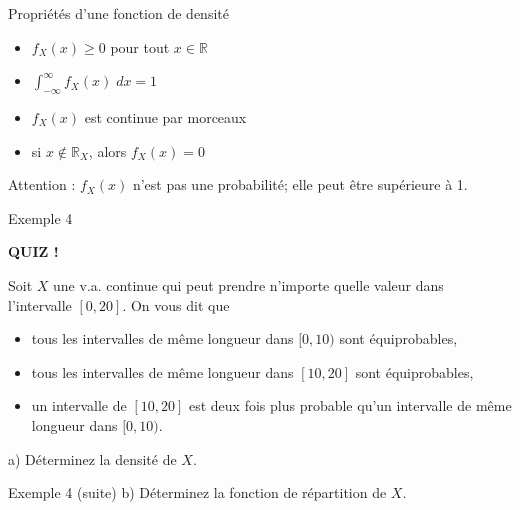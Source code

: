 \documentclass{BeamerTemplate}
\newcommand{\cibleReponse}{}
\newcommand{\lienreponse}[1]{\gdef\cibleReponse{#1}}
\begin{document}
\begin{frame}[t]{Propriétés d'une fonction de densité}

\begin{itemize}
 \item[1.] $f_X(x)\ge0$ pour tout $x\in\mathbb{R}$
 \item[2.] $\displaystyle\int_{-\infty}^\infty f_X(x)\;dx=1$
 \item[3.] $f_X(x)$ est continue par morceaux
 \item[4.] si $x\notin \mathbb{R}_X$, alors $f_X(x)=0$
\end{itemize}

{\color{gray}\small Attention : $f_X(x)$ n'est pas une probabilité; elle peut être supérieure à 1.}


\end{frame}

\begin{frame}[t,label=ex4]{Exemple 4}

\centerline{\LARGE\bfseries\alert{QUIZ !}}

{\small
Soit $X$ une v.a. continue qui peut prendre n'importe quelle valeur dans l'intervalle
$[0,20]$. On vous dit que
\begin{itemize}
\item tous les intervalles de même longueur dans $[0,10)$ sont équiprobables,
\item tous les intervalles de même longueur dans $[10,20]$ sont équiprobables,
\item un intervalle de $[10,20]$ est deux fois plus probable qu'un intervalle de même longueur dans $[0,10)$.
    \end{itemize}
\medskip
a) Déterminez la densité de $X$.}
\lienreponse{rep-quiz}
\end{frame}

\begin{frame}[t]{Exemple 4 (suite)}
b) Déterminez la fonction de répartition de $X$.
\lienreponse{rep-quiz}
\end{frame}
\end{document}
